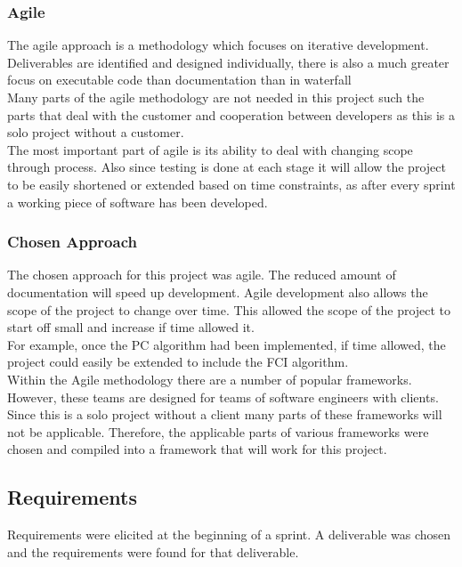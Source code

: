 \documentclass{article}
\begin{document}
\subsubsection{Agile}
The agile approach is a methodology which focuses on iterative development. Deliverables are identified and designed individually, there is also a much greater focus on executable code than documentation than in waterfall\\

Many parts of the agile methodology are not needed in this project such the parts that deal with the customer and cooperation between developers as this is a solo project without a customer.\\

The most important part of agile is its ability to deal with changing scope through process. Also since testing is done at each stage it will allow the project to be easily shortened or extended based on time constraints, as after every sprint a working piece of software has been developed.\\

\subsubsection{Chosen Approach}

The chosen approach for this project was agile. The reduced amount of documentation will speed up development. Agile development also allows the scope of the project to change over time. This allowed the scope of the project to start off small and increase if time allowed it.\\

For example, once the PC algorithm had been implemented, if time allowed, the project could easily be extended to include the FCI algorithm.\\

Within the Agile methodology there are a number of popular frameworks. However, these teams are designed for teams of software engineers with clients. Since this is a solo project without a client many parts of these frameworks will not be applicable. Therefore, the applicable parts of various frameworks were chosen and compiled into a framework that will work for this project.



\subsection{Requirements}
Requirements were elicited at the beginning of a sprint. A deliverable was chosen and the requirements were found for that deliverable.
\end{document}
